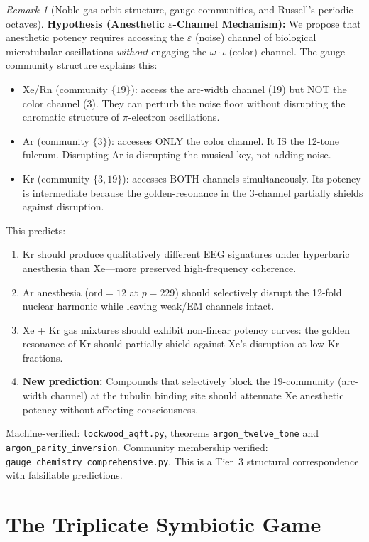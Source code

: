 \documentclass[12pt,oneside]{article}
\theoremstyle{principia}
\theoremstyle{definition}
\theoremstyle{remark}
\newtheorem{remark}[theorem]{Remark}
\begin{document}
\begin{remark}[Noble gas orbit structure, gauge communities, and Russell's periodic octaves]
\textbf{Hypothesis (Anesthetic $\varepsilon$-Channel Mechanism):} We propose that anesthetic potency requires accessing the $\varepsilon$ (noise) channel of biological microtubular oscillations \emph{without} engaging the $\omega \cdot \iota$ (color) channel. The gauge community structure explains this:
\begin{itemize}[noitemsep]
  \item Xe/Rn (community $\{19\}$): access the arc-width channel (19) but NOT the color channel (3). They can perturb the noise floor without disrupting the chromatic structure of $\pi$-electron oscillations.
  \item Ar (community $\{3\}$): accesses ONLY the color channel. It IS the 12-tone fulcrum. Disrupting Ar is disrupting the musical key, not adding noise.
  \item Kr (community $\{3,19\}$): accesses BOTH channels simultaneously. Its potency is intermediate because the golden-resonance in the 3-channel partially shields against disruption.
\end{itemize}
This predicts:
\begin{enumerate}[noitemsep]
  \item Kr should produce qualitatively different EEG signatures under hyperbaric anesthesia than Xe---more preserved high-frequency coherence.
  \item Ar anesthesia ($\mathrm{ord} = 12$ at $p = 229$) should selectively disrupt the 12-fold nuclear harmonic while leaving weak/EM channels intact.
  \item Xe + Kr gas mixtures should exhibit non-linear potency curves: the golden resonance of Kr should partially shield against Xe's disruption at low Kr fractions.
  \item \textbf{New prediction:} Compounds that selectively block the 19-community (arc-width channel) at the tubulin binding site should attenuate Xe anesthetic potency without affecting consciousness.
\end{enumerate}
Machine-verified: \texttt{lockwood\_aqft.py}, theorems \texttt{argon\_twelve\_tone} and \texttt{argon\_parity\_inversion}. Community membership verified: \texttt{gauge\_chemistry\_comprehensive.py}.
This is a Tier~3 structural correspondence with falsifiable predictions.
\end{remark}

\section{The Triplicate Symbiotic Game}
\end{document}
